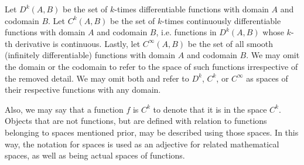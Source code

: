 \documentclass[a4paper,12pt]{article}
\begin{document}
Let $D^k(A, B)$ be the set of $k$-times differentiable functions with domain $A$ and codomain $B$.
Let $C^k(A, B)$ be the set of $k$-times continuously differentiable functions with domain $A$ and codomain $B$, i.e. functions in $D^k(A, B)$ whose $k$-th derivative is continuous.
Lastly, let $C^\infty(A, B)$ be the set of all smooth (infinitely differentiable) functions with domain $A$ and codomain $B$.
We may omit the domain or the codomain to refer to the space of such functions irrespective of the removed detail.
We may omit both and refer to $D^k$, $C^k$, or $C^\infty$ as spaces of their respective functions with any domain.
    
Also, we may say that a function $f$ is $C^k$ to denote that it is in the space $C^k$.
Objects that are not functions, but are defined with relation to functions belonging to spaces mentioned prior, may be described using those spaces.
In this way, the notation for spaces is used as an adjective for related mathematical spaces, as well as being actual spaces of functions.
\end{document}

